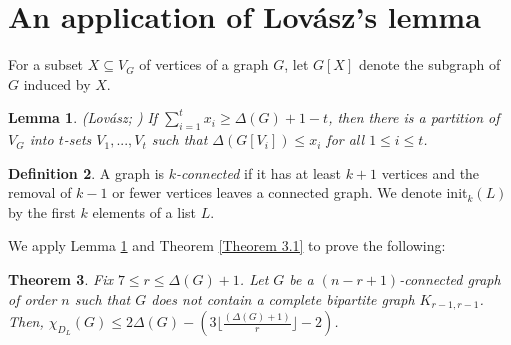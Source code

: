 \documentclass[12pt,reqno,a4paper]{amsart}
\theoremstyle{definition}
\newtheorem{defn}{Definition}[section]
\newtheorem{thm}[defn]{Theorem}
\newtheorem{lem}[defn]{Lemma}
\begin{document}
\section{An application of Lov\'{a}sz's lemma}
For a subset $X\subseteq V_{G}$ of vertices of a graph $G$, let $G[X]$ denote the subgraph of $G$ induced by $X$. 

\begin{lem}\label{Lemma 4.1}{\em (Lov\'{a}sz; \cite{Lov1966})}
{\em If $\sum_{i=1}^{t} x_{i}\geq \Delta(G)+1-t$, then there is a partition of $V_{G}$ into $t$-sets $V_{1},...,V_{t}$ such that $\Delta(G[V_{i}])\leq x_{i}$ for all $1\leq i\leq t$.}     
\end{lem}

\begin{defn}\label{Definition 4.2}
A graph is {\em $k$-connected} if it has at least $k+1$ vertices and the removal of $k-1$ or fewer vertices leaves a connected graph. We denote init$_{k}(L)$ by the first $k$ elements of a list $L$.
\end{defn}

We apply Lemma \ref{Lemma 4.1} and Theorem \ref{Theorem 3.1} to prove the following:

\begin{thm}\label{Theorem 4.3}{\em Fix $7\leq r\leq \Delta(G)+1$. Let $G$ be a $(n-r+1)$-connected graph of order $n$ such that $G$ does not contain a complete bipartite graph $K_{r-1,r-1}$.
Then, $\chi_{D_{L}}(G)\leq 2\Delta(G)-  (3\lfloor\frac{(\Delta(G)+1)}{r}\rfloor-2)$.
}
\end{thm}
\end{document}
